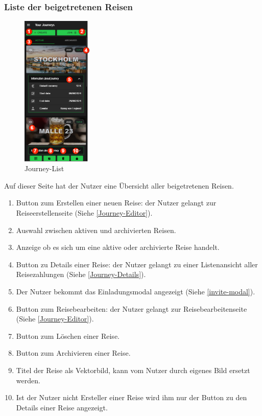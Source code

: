 \subsubsection{Liste der beigetretenen Reisen}\label{Journey-List}
\begin{figure}[H]
    \centering
    \includegraphics[width=0.3\textwidth]{img/pages_numbers/journey-list.drawio}
    \caption[Journey-List]{Journey-List}
    \label{fig:Journey-List}
\end{figure}
Auf dieser Seite hat der Nutzer eine Übersicht aller beigetretenen Reisen.
\begin{enumerate}[label=\protect\circled{\arabic*}]
	\item Button zum Erstellen einer neuen Reise: der Nutzer gelangt zur Reiseerstellenseite  (Siehe \ref{Journey-Editor}).
	\item Auswahl zwischen aktiven und archivierten Reisen.
	\item Anzeige ob es sich um eine aktive oder archivierte Reise handelt.
	\item Button zu Details einer Reise: der Nutzer gelangt zu einer Listenansicht aller Reisezahlungen  (Siehe \ref{Journey-Details}).
	\item Der Nutzer bekommt das Einladungsmodal angezeigt (Siehe \ref{invite-modal}).
	\item Button zum Reisebearbeiten: der Nutzer gelangt zur Reisebearbeitenseite (Siehe \ref{Journey-Editor}).
	\item Button zum Löschen einer Reise.
	\item Button zum Archivieren einer Reise.
	\item Titel der Reise als Vektorbild, kann vom Nutzer durch eigenes Bild ersetzt werden.
	\item Ist der Nutzer nicht Ersteller einer Reise wird ihm nur der Button zu den Details einer Reise angezeigt.
\end{enumerate}

